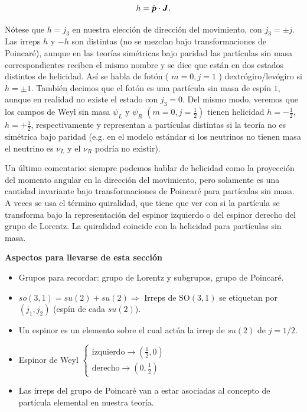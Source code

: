 \begin{itemize}
    \begin{equation}
        h=\hat{\vb*{p}} \cdot \vb*{J}.
    \end{equation}
    
    Nótese que $h=j_3$ en nuestra elección de dirección del movimiento, con $j_3=\pm j$. Las irreps $h$ y $-h$ son distintas (no se mezclan bajo transformaciones de Poincaré), aunque en las teorías simétricas bajo paridad las partículas sin masa correspondientes reciben el mismo nombre y se dice que están en dos estados distintos de helicidad. Así se habla de fotón ( $m=0, j=1$ ) dextrógiro/levógiro si $h=\pm 1$. También decimos que el fotón es una partícula sin masa de espín $1$, aunque en realidad no existe el estado con $j_3=0$. Del mismo modo, veremos que los campos de Weyl sin masa $\psi_L$ y $\psi_R$ $\left(m=0, j=\frac{1}{2}\right)$ tienen helicidad $h=-\frac{1}{2}$, $h=+\frac{1}{2}$, respectivamente y representan a partículas distintas si la teoría no es simétrica bajo paridad (e.g. en el modelo estándar si los neutrinos no tienen masa el neutrino es $\nu_L$ y el $\nu_R$ podría no existir).
    
    Un último comentario: siempre podemos hablar de helicidad como la proyección del momento angular en la dirección del movimiento, pero solamente es una cantidad invariante bajo transformaciones de Poincaré para partículas sin masa. A veces se usa el término quiralidad, que tiene que ver con si la partícula se transforma bajo la representación del espinor izquierdo o del espinor derecho del grupo de Lorentz. La quiralidad coincide con la helicidad para partículas sin masa.
\end{itemize}

\begin{cabox}
    \textbf{Aspectos para llevarse de esta sección}
    \renewcommand{\labelitemi}{\ding{42}}
    \begin{itemize}
        \item Grupos para recordar: grupo de Lorentz y subgrupos, grupo de Poincaré.
        \item $so(3,1)=su(2)+su(2) \Longrightarrow$ Irreps de $\mathrm{SO}(3,1)$ se etiquetan por $\left(j_1, j_2\right)$ (espín de cada $su(2)$).
        \item Un espinor es un elemento sobre el cual actúa la irrep de $s u(2)$ de $j=1/2$.
        \item Espinor de Weyl 
              $\begin{cases}
              \text{izquierdo} \rightarrow\left(\frac{1}{2}, 0\right)\\ 
              \text{derecho} \rightarrow \left(0, \frac{1}{2}\right) 
              \end{cases}$
        \item Las irreps del grupo de Poincaré van a estar asociadas al concepto de partícula elemental en nuestra teoría.
    \end{itemize}
\end{cabox}



